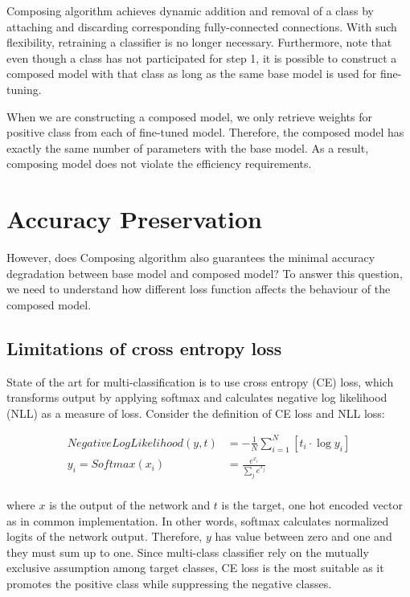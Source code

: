 \documentclass{article}
\begin{document}
Composing algorithm achieves dynamic addition and removal of a class by attaching and discarding corresponding fully-connected connections.
With such flexibility, retraining a classifier is no longer necessary. Furthermore, note that even though a class has not participated for step 1, it is possible to construct a composed model with that class as long as the same base model is used for fine-tuning.

When we are constructing a composed model, we only retrieve weights for positive class from each of fine-tuned model. Therefore, the composed model has exactly the same number of parameters with the base model. As a result, composing model does not violate the efficiency requirements.

\section{Accuracy Preservation}

However, does Composing algorithm also guarantees the minimal accuracy degradation between base model and composed model? To answer this question, we need to understand how different loss function affects the behaviour of the composed model.

\subsection{Limitations of cross entropy loss}

State of the art for multi-classification is to use cross entropy (CE) loss, which transforms output by applying softmax and calculates negative log likelihood (NLL) as a measure of loss. Consider the definition of CE loss and NLL loss:

\begin{align*}
NegativeLogLikelihood(y, t) & = -\frac{1}{N}\sum_{i=1}^N \left[ t_i \cdot \log y_i\right] \\
y_i = Softmax(x_i) &= \frac{e^{x_i}}{\sum_{j}e^{x_j}} \\
\end{align*}

where $x$ is the output of the network and $t$ is the target, one hot encoded vector as in common implementation. In other words, softmax calculates normalized logits of the network output. Therefore, $y$ has value between zero and one and they must sum up to one. Since multi-class classifier rely on the mutually exclusive assumption among target classes, CE loss is the most suitable as it promotes the positive class while suppressing the negative classes.
\end{document}
